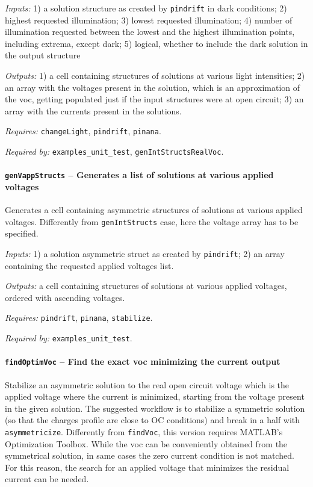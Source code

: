 		\textit{Inputs:} 1) a solution structure as created by \texttt{pindrift} in dark conditions; 
		2) highest requested illumination;
		3) lowest requested illumination;
		4) number of illumination requested between the lowest and the highest illumination points, including extrema, except dark;
		5) logical, whether to include the dark solution in the output structure
		
\textit{Outputs:} 1) a cell containing structures of solutions at various light
     intensities;
2) an array with the voltages present in the solution, which is
     an approximation of the \gls{voc}, getting populated just if the input
     structures were at open circuit;
 3) an array with the currents present in the solutions.
 
\textit{Requires:} \texttt{change\-Light}, \texttt{pindrift}, \texttt{pinana}.

\textit{Required by:} \texttt{examples\_unit\_test}, \texttt{gen\-Int\-Structs\-Real\-Voc}.

		\paragraph{\texttt{gen\-Vapp\-Structs} -- Generates a list of solutions at various applied voltages}\label{genVappStructs}
Generates a cell containing asymmetric structures of solutions at various applied voltages.
Differently from \texttt{gen\-Int\-Structs} case, here the voltage array has to be specified.

\textit{Inputs:} 1) a solution asymmetric struct as created by \texttt{pindrift};
2) an array containing the requested applied voltages list.

\textit{Outputs:} a cell containing structures of solutions at various applied
     voltages, ordered with ascending voltages.
     
\textit{Requires:} \texttt{pindrift}, \texttt{pinana}, \texttt{stabilize}.

\textit{Required by:} \texttt{examples\_unit\_test}.

		\paragraph{\texttt{find\-Optim\-Voc} -- Find the exact \gls{voc} minimizing the current output}
Stabilize an asymmetric solution to the real open circuit voltage
which is the applied voltage where the current is minimized,
starting from the voltage present in the given solution. The suggested
workflow is to stabilize a symmetric solution (so that the charges
profile are close to OC conditions) and break in a half with
\texttt{asymmetricize}.
Differently from \texttt{findVoc}, this version requires MATLAB's Optimization Toolbox.
While the \gls{voc} can be conveniently obtained from the symmetrical solution, in same cases the zero current condition is not matched.
For this reason, the search for an applied voltage that minimizes the residual current can be needed.
		
